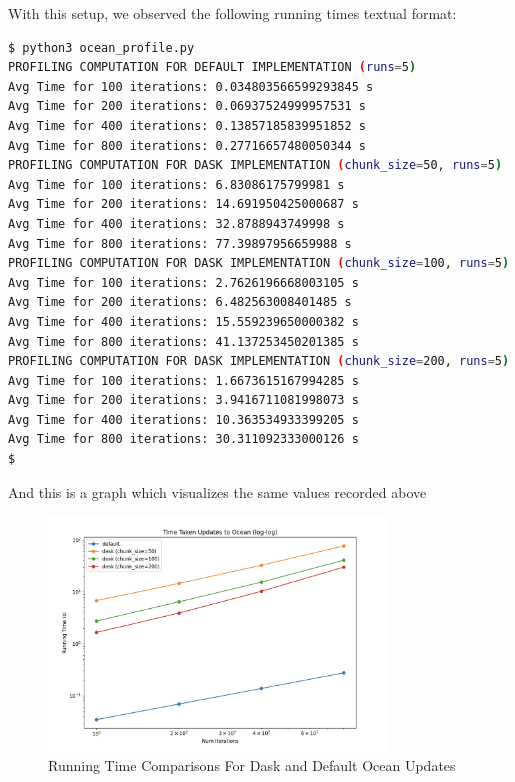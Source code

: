 \documentclass[a4paper,12pt]{article}
\begin{document}
With this setup, we observed the following running times textual format: 

\begin{lstlisting}[language=bash,basicstyle=\tiny\ttfamily]
$ python3 ocean_profile.py
PROFILING COMPUTATION FOR DEFAULT IMPLEMENTATION (runs=5)
Avg Time for 100 iterations: 0.034803566599293845 s 
Avg Time for 200 iterations: 0.06937524999957531 s 
Avg Time for 400 iterations: 0.13857185839951852 s 
Avg Time for 800 iterations: 0.27716657480050344 s 
PROFILING COMPUTATION FOR DASK IMPLEMENTATION (chunk_size=50, runs=5)
Avg Time for 100 iterations: 6.83086175799981 s 
Avg Time for 200 iterations: 14.691950425000687 s 
Avg Time for 400 iterations: 32.8788943749998 s 
Avg Time for 800 iterations: 77.39897956659988 s 
PROFILING COMPUTATION FOR DASK IMPLEMENTATION (chunk_size=100, runs=5)
Avg Time for 100 iterations: 2.7626196668003105 s 
Avg Time for 200 iterations: 6.482563008401485 s 
Avg Time for 400 iterations: 15.559239650000382 s 
Avg Time for 800 iterations: 41.137253450201385 s 
PROFILING COMPUTATION FOR DASK IMPLEMENTATION (chunk_size=200, runs=5)
Avg Time for 100 iterations: 1.6673615167994285 s 
Avg Time for 200 iterations: 3.9416711081998073 s 
Avg Time for 400 iterations: 10.363534933399205 s 
Avg Time for 800 iterations: 30.311092333000126 s 
$
\end{lstlisting}

And this is a graph which visualizes the same values recorded above

\begin{figure}[H]
  \centering
  \includegraphics[width=0.8\textwidth]{../images/bonus_default_dask_runtimes.png}
  \caption{Running Time Comparisons For Dask and Default Ocean Updates}
\end{figure}
\end{document}
